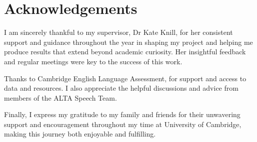 \section*{\centering Acknowledgements}
\vspace{1.5cm}
\begin{flushleft}
I am sincerely thankful to my supervisor, Dr Kate Knill, for her consistent support and guidance throughout the year in shaping my project and helping me produce results that extend beyond academic curiosity. Her insightful feedback and regular meetings were key to the success of this work.

Thanks to Cambridge English Language Assessment, for support and access to data and resources. I also appreciate the helpful discussions and advice from members of the ALTA Speech Team.

Finally, I express my gratitude to my family and friends for their unwavering support and encouragement throughout my time at University of Cambridge, making this journey both enjoyable and fulfilling.
\end{flushleft}
\clearpage
